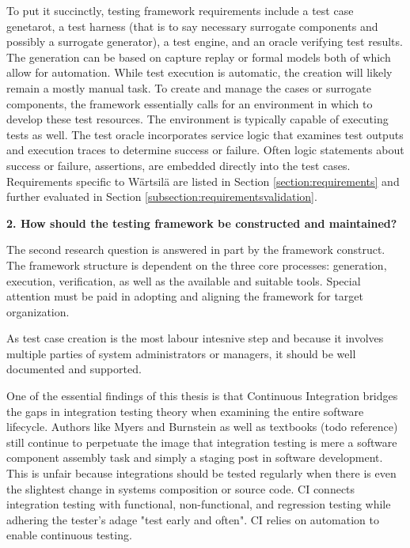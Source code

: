 \documentclass[12pt,a4paper,oneside,pdftex]{report}
\begin{document}
{To put it succinctly, testing framework requirements include a test case genetarot, a test harness (that is to say necessary surrogate components and possibly a surrogate generator), a test engine, and an oracle verifying test results. The generation can be based on capture replay or formal models both of which allow for automation. While test execution is automatic, the creation will likely remain a mostly manual task. To create and manage the cases or surrogate components, the framework essentially calls for an environment in which to develop these test resources. The environment is typically capable of executing tests as well. The test oracle incorporates service logic that examines test outputs and execution traces to determine success or failure. Often logic statements about success or failure, assertions, are embedded directly into the test cases. Requirements specific to Wärtsilä are listed in Section \ref{section:requirements} and further evaluated in Section \ref{subsection:requirementsvalidation}. 

\begin{adjustwidth}{2.5em}{0pt}
\textbf{2. How should the testing framework be constructed and maintained?} \\
\end{adjustwidth}

The second research question is answered in part by the framework construct. The framework structure is dependent on the three core processes: generation, execution, verification, as well as the available and suitable tools. Special attention must be paid in adopting and aligning the framework for target organization.

As test case creation is the most labour intesnive step and because it involves multiple parties of system administrators or managers, it should be well documented and supported.  

One of the essential findings of this thesis is that Continuous Integration bridges the gaps in integration testing theory when examining the entire software lifecycle. Authors like Myers and Burnstein as well as textbooks (todo reference) still continue to perpetuate the image that integration testing is mere a software component assembly task and simply a staging post in software development. This is unfair because integrations should be tested regularly when there is even the slightest change in systems composition or source code. CI connects integration testing with functional, non-functional, and regression testing while adhering the tester's adage "test early and often". CI relies on automation to enable continuous testing.

}
\end{document}
